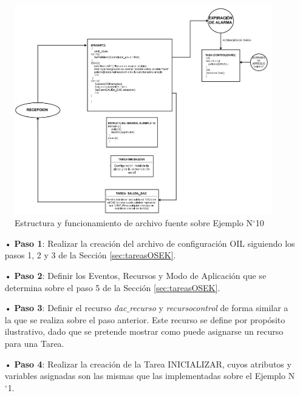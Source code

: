 \documentclass[12pt,letterpaper]{article}
\begin{document}
\begin{figure}[H]
\centering
\includegraphics[width=18 cm]{figuras/f53.png}
\caption{Estructura y funcionamiento de archivo fuente sobre Ejemplo N$^{\circ}$10}
\label{Fig46}
\end{figure}
\begin{enumerate}

\item[•]\textbf{Paso 1}: Realizar la creación del archivo de configuración OIL siguiendo los pasos 1, 2 y 3 de la Sección \ref{sec:tareasOSEK}.
\item[•]\textbf{Paso 2}: Definir los Eventos, Recursos y Modo de Aplicación que se determina sobre el paso 5 de la Sección \ref{sec:tareasOSEK}.
\item[•]\textbf{Paso 3}: Definir el recurso \textit{dac$\_$recurso} y \textit{recursocontrol} de forma similar a la que se realiza sobre el paso anterior. Este recurso se define por propósito ilustrativo, dado que se pretende mostrar como puede asignarse un recurso para una Tarea.
\item[•]\textbf{Paso 4}: Realizar la creación de la Tarea INICIALIZAR, cuyos atributos y variables asignadas son las mismas que las implementadas sobre el Ejemplo N$^{\circ}$1.



\end{enumerate}
\end{document}
